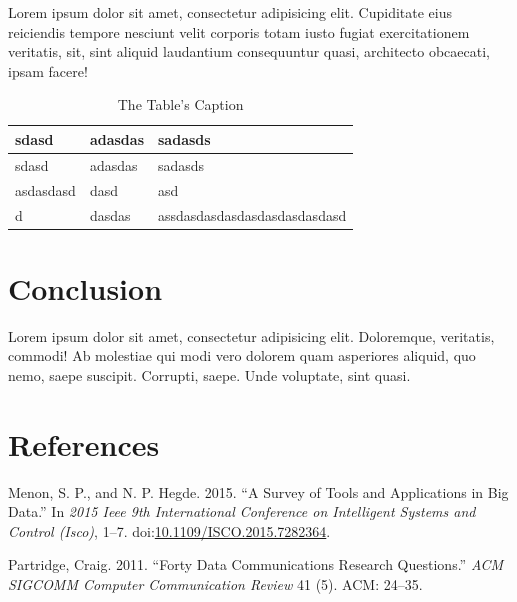 Lorem ipsum dolor sit amet, consectetur adipisicing elit. Cupiditate
eius reiciendis tempore nesciunt velit corporis totam iusto fugiat
exercitationem veritatis, sit, sint aliquid laudantium consequuntur
quasi, architecto obcaecati, ipsam facere!

\begin{longtable}[]{@{}lll@{}}
\caption{The Table's Caption}\tabularnewline
\toprule
sdasd & adasdas & sadasds\tabularnewline
\midrule
\endfirsthead
\toprule
sdasd & adasdas & sadasds\tabularnewline
\midrule
\endhead
asdasdasd & dasd & asd\tabularnewline
d & dasdas & assdasdasdasdasdasdasdasdasd\tabularnewline
\bottomrule
\end{longtable}

\chapter{Conclusion}\label{conclusion}

Lorem ipsum dolor sit amet, consectetur adipisicing elit. Doloremque,
veritatis, commodi! Ab molestiae qui modi vero dolorem quam asperiores
aliquid, quo nemo, saepe suscipit. Corrupti, saepe. Unde voluptate, sint
quasi.

\chapter*{References}\label{references}

\hypertarget{refs}{}
\hypertarget{ref-7282364}{}
Menon, S. P., and N. P. Hegde. 2015. ``A Survey of Tools and
Applications in Big Data.'' In \emph{2015 Ieee 9th International
Conference on Intelligent Systems and Control (Isco)}, 1--7.
doi:\href{https://doi.org/10.1109/ISCO.2015.7282364}{10.1109/ISCO.2015.7282364}.

\hypertarget{ref-partridge2011forty}{}
Partridge, Craig. 2011. ``Forty Data Communications Research
Questions.'' \emph{ACM SIGCOMM Computer Communication Review} 41 (5).
ACM: 24--35.
